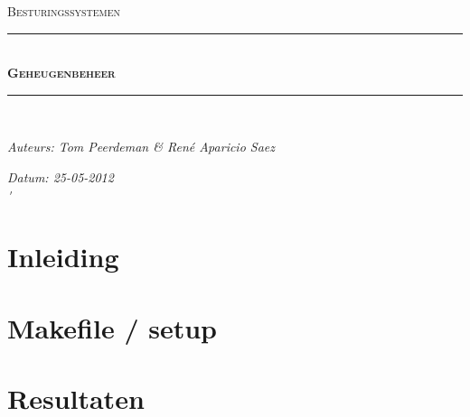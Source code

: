 \documentclass[11pt]{article}
\newcommand{\HRule}{\rule{\linewidth}{0.5mm}}
\begin{document}
	\begin{titlepage}
	\begin{center}
		\textsc{\Large Besturingssystemen}\\[0.5cm]
		\HRule \\[0,4cm]
		\textsc{\huge \bfseries Geheugenbeheer}
		\HRule \\[8cm]
		\begin{minipage}{0.4\textwidth}
			\begin{flushleft}\large
				\emph{Auteurs: Tom Peerdeman \& Ren\'e Aparicio Saez}\\
			\end{flushleft}
		\end{minipage}
		\begin{minipage}{0.4\textwidth}
			\begin{flushright}\large
			\emph{Datum: 25-05-2012\\\'}\\
			\end{flushright}
		\end{minipage}
	\end{center}
	\end{titlepage}

	\tableofcontents
	\newpage

	\section{Inleiding}\label{sec:inleiding}

	\section{Makefile / setup}\label{sec:makefile}

	\section{Resultaten}\label{sec:resultaten}
\end{document}
